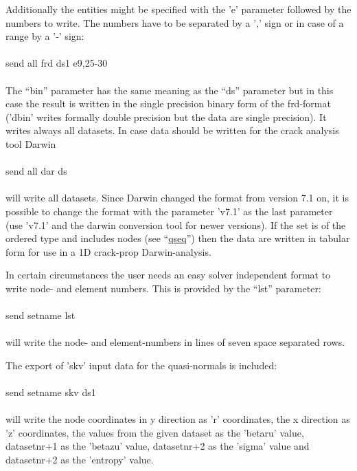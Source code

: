\documentclass{article}
\providecommand{\htmlref}[2]{\hyperref[#2]{#1}}
\begin{document}
Additionally the entities might be specified with the 'e' parameter followed by the numbers to write. The numbers have to be separated by a ',' sign or in case of a range by a '-' sign:\\\\send all frd ds1 e9,25-30\\\\ The ``bin'' parameter has the same meaning as the ``ds'' parameter but in this case the result is written in the single precision binary form of the frd-format ('dbin' writes formally double precision but the data are single precision). It writes always all datasets. In case data should be written for the crack analysis tool Darwin\\\\send all dar ds\\\\will write all datasets. Since Darwin changed the format from version 7.1 on, it is possible to change the format with the parameter 'v7.1' as the last parameter (use 'v7.1' and the darwin conversion tool for newer versions). If the set is of the ordered type and includes nodes (see ``\htmlref{qseq}{qseq}'') then the data are written in tabular form for use in a 1D crack-prop Darwin-analysis.

In certain circumstances the user needs an easy solver independent format to write node- and element numbers. This is provided by the ``lst'' parameter:\\\\send setname lst\\\\will write the node- and element-numbers in lines of seven space separated rows.

The export of 'skv' input data for the quasi-normals is included:\\\\send setname skv ds1\\\\will write the node coordinates in y direction as 'r' coordinates, the x direction as 'z' coordinates, the values from the given dataset as the 'betaru' value, datasetnr+1  as the 'betazu' value, datasetnr+2  as the 'sigma' value and datasetnr+2  as the 'entropy' value.
\end{document}
